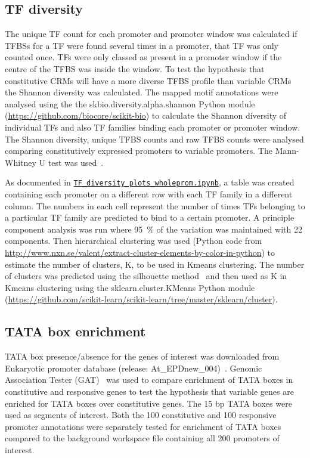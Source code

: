 \documentclass[../Sam_Witham_Thesis.tex]{subfiles}
\begin{document}
\subsection{TF diversity}
{\label{chapter1:methods:tf-diversity}}

The unique TF count for each promoter and promoter window was calculated \ie{} if TFBSs for a TF were found several times in a promoter, that TF was only counted once.
TFs were only classed as present in a promoter window if the centre of the TFBS was inside the window.
To test the hypothesis that constitutive CRMs will have a more diverse TFBS profile than variable CRMs the Shannon diversity was calculated.
The mapped motif annotations were analysed using the the skbio.diversity.alpha.shannon Python module (\url{https://github.com/biocore/scikit-bio}) to calculate the Shannon diversity of individual TFs and also TF families binding each promoter or promoter window.
The Shannon diversity, unique TFBS counts and raw TFBS counts were analysed comparing constitutively expressed promoters to variable promoters.
The Mann\hyp{}Whitney U test was used~\autocite{mannTestWhetherOne1947}.

As documented in \href{https://github.com/Switham1/PromoterArchitecture/blob/master/src/plotting/TF_diversity_plots_wholeprom.ipynb}{\texttt{TF\_diversity\_plots\_wholeprom.ipynb}}, a table was created containing each promoter on a different row with each TF family in a different column.
The numbers in each cell represent the number of times TFs belonging to a particular TF family are predicted to bind to a certain promoter.
A principle component analysis was run where \SI{95}{\percent} of the variation was maintained with 22 components.
Then hierarchical clustering was used (Python code from \url{http://www.nxn.se/valent/extract-cluster-elements-by-color-in-python}) to estimate the number of clusters, K, to be used in Kmeans clustering.
The number of clusters was predicted using the silhouette method~\autocite{rousseeuwSilhouettesGraphicalAid1987} and then used as K in Kmeans clustering using the sklearn.cluster.KMeans Python module (\url{https://github.com/scikit-learn/scikit-learn/tree/master/sklearn/cluster}).

\subsection{TATA box enrichment}
\label{chapter1:methods:tata-box-enrichment}

TATA box presence/absence for the genes of interest was downloaded from Eukaryotic promoter database (release: At\_EPDnew\_004)~\autocite{dreosEukaryoticPromoterDatabase2017}.
Genomic Association Tester (GAT)~\autocite{hegerGATSimulationFramework2013} was used to
compare enrichment of TATA boxes in constitutive and responsive genes to test the hypothesis that variable genes are enriched for TATA boxes over constitutive genes.
The 15 bp TATA boxes were used as segments of interest. Both the 100 constitutive and 100 responsive promoter annotations were separately tested for enrichment of TATA boxes compared to the background workspace file containing all 200 promoters of interest.
\end{document}
